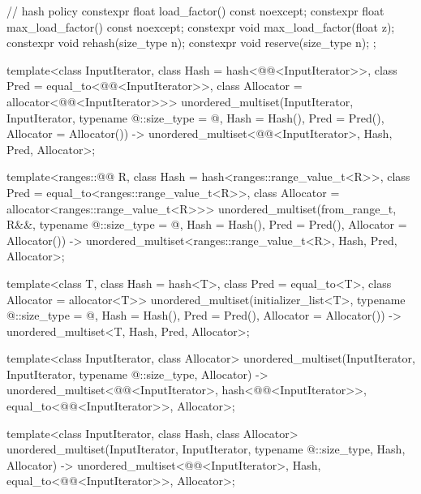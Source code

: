 \begin{codeblock}
{{    // hash policy
    constexpr float load_factor() const noexcept;
    constexpr float max_load_factor() const noexcept;
    constexpr void max_load_factor(float z);
    constexpr void rehash(size_type n);
    constexpr void reserve(size_type n);
  };

  template<class InputIterator,
           class Hash = hash<@@<InputIterator>>,
           class Pred = equal_to<@@<InputIterator>>,
           class Allocator = allocator<@@<InputIterator>>>
    unordered_multiset(InputIterator, InputIterator, typename @\seebelow@::size_type = @\seebelow@,
                       Hash = Hash(), Pred = Pred(), Allocator = Allocator())
      -> unordered_multiset<@@<InputIterator>,
                            Hash, Pred, Allocator>;

  template<ranges::@@ R,
           class Hash = hash<ranges::range_value_t<R>>,
           class Pred = equal_to<ranges::range_value_t<R>>,
           class Allocator = allocator<ranges::range_value_t<R>>>
    unordered_multiset(from_range_t, R&&, typename @\seebelow@::size_type = @\seebelow@,
                       Hash = Hash(), Pred = Pred(), Allocator = Allocator())
      -> unordered_multiset<ranges::range_value_t<R>, Hash, Pred, Allocator>;

  template<class T, class Hash = hash<T>,
           class Pred = equal_to<T>, class Allocator = allocator<T>>
    unordered_multiset(initializer_list<T>, typename @\seebelow@::size_type = @\seebelow@,
                       Hash = Hash(), Pred = Pred(), Allocator = Allocator())
      -> unordered_multiset<T, Hash, Pred, Allocator>;

  template<class InputIterator, class Allocator>
    unordered_multiset(InputIterator, InputIterator, typename @\seebelow@::size_type, Allocator)
      -> unordered_multiset<@@<InputIterator>,
                            hash<@@<InputIterator>>,
                            equal_to<@@<InputIterator>>,
                            Allocator>;

  template<class InputIterator, class Hash, class Allocator>
    unordered_multiset(InputIterator, InputIterator, typename @\seebelow@::size_type,
                       Hash, Allocator)
      -> unordered_multiset<@@<InputIterator>, Hash,
                            equal_to<@@<InputIterator>>,
                            Allocator>;

}
\end{codeblock}
